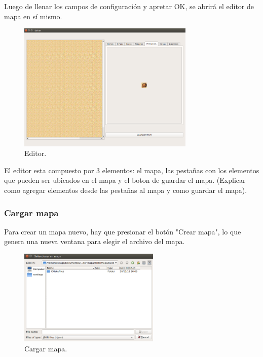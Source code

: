 \documentclass[titlepage,a4paper,12pt]{article}
\begin{document}
Luego de llenar los campos de configuración y apretar OK, se abrirá el editor de mapa en sí mismo.\\ 

\begin{figure}[H]
	\centering
	\includegraphics[width=0.75\textwidth]{../imagenes/editor_ui.png}
	\caption{\label{fig:menu_editor} Editor.}
\end{figure}

El editor esta compuesto por 3 elementos: el mapa, las pestañas con los elementos que pueden ser ubicados en el mapa y el boton de guardar el mapa. (Explicar como agregar elementos desde las pestañas al mapa y como guardar el mapa).\\

\subsubsection{Cargar mapa}

Para crear un mapa nuevo, hay que presionar el botón "Crear mapa", lo que genera una nueva ventana para elegir el archivo del mapa.\\

\begin{figure}[H]
	\centering
	\includegraphics[width=0.6\textwidth]{../imagenes/cargar_mapa.png}
	\caption{\label{fig:menu_editor} Cargar mapa.}
\end{figure}
\end{document}
